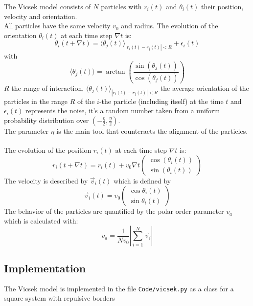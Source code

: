 \documentclass{article}
\begin{document}
The Vicsek model consists of $N$ particles with $r_i(t)$ and $\theta_i(t)$ 
their position, velocity and orientation.\\
All particles have the same velocity $v_0$ and radius.
The evolution of the orientation $\theta_i(t)$ at each time step $\nabla t$ is:
$$\theta_i(t + \nabla t) = \langle\theta_j(t)\rangle_{|r_i(t) - r_j(t)| < R} + \epsilon_i(t)$$
with
$$\langle\theta_j(t)\rangle = \arctan\left(\frac{\sin(\theta_j(t))}{\cos(\theta_j(t))}\right)$$
$R$ the range of interaction, $\langle\theta_j(t)\rangle_{|r_i(t) - r_j(t)| < R}$ the average 
orientation of the particles in the range $R$ of
 the $i$-the particle (including itself) at the time $t$ and $\epsilon_i(t)$ represents the noise, 
 it's a random number taken from a uniform probability distribution
over $\left(-\frac{\eta}{2}, \frac{\eta}{2}\right)$.\\
The parameter $\eta$ is the main tool that counteracts the alignment of the particles.\\
\\
The evolution of the position $r_i(t)$ at each time step $\nabla t$ is:
$$ r_i(t + \nabla t) = r_i(t) + v_0\nabla t \begin{pmatrix}
    \cos(\theta_i(t))\\
    \sin(\theta_i(t))
\end{pmatrix}$$
The velocity is described by $\vec{v}_i(t)$ which is defined by
$$\vec{v}_i(t) = v_0\begin{pmatrix}
    \cos\theta_i(t)\\
    \sin\theta_i(t)
\end{pmatrix}$$
The behavior of the particles are quantified by the polar order parameter $v_a$ which is calculated with:
$$v_a = \frac{1}{Nv_0}\left|\sum^{N}_{i=1}\vec{v}_i\right|$$

\subsection{Implementation}
The Vicsek model is implemented in the file \texttt{Code/vicsek.py} as a class 
for a square system with repulsive borders
\end{document}
